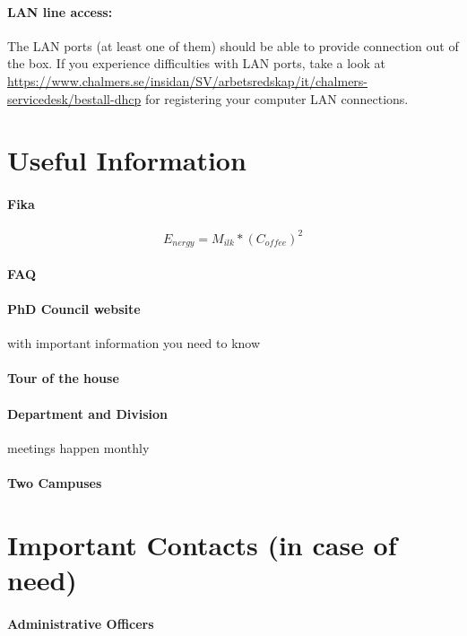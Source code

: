 \documentclass[acmtog]{acmart}
\begin{document}
\paragraph{LAN line access:}

The LAN ports (at least one of them) should be able to provide connection out of the box. 
If you experience difficulties with LAN ports, take a look at \url{https://www.chalmers.se/insidan/SV/arbetsredskap/it/chalmers-servicedesk/bestall-dhcp} for registering your computer LAN connections. 


\section{Useful Information}
\paragraph{Fika}
\begin{equation}
E_{nergy} = M_{ilk} * (C_{offee})^2
\end{equation}


\paragraph{FAQ}

\paragraph{PhD Council website}
with important information you need to know 

\paragraph{Tour of the house}

\paragraph{Department and Division}
meetings happen monthly

\paragraph{Two Campuses}

\section{Important Contacts (in case of need)}
\paragraph{Administrative Officers}
\\
\end{document}
